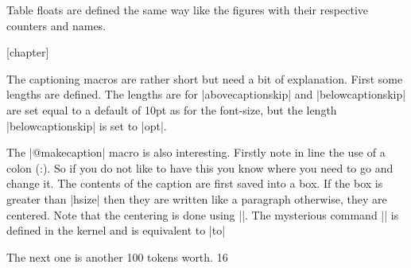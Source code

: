 \begin{multicols}{2}
 Table floats are defined the same way like the figures with their respective counters and names.  
\end{multicols}

\begin{teX}
[chapter]
\renewcommand \thetable
     {\ifnum \c@chapter>\z@ \thechapter.\fi \@arabic\c@table}
\def\fps@table{tbp}
\def\ftype@table{2}
\def\ext@table{lot}
\def\fnum@table{\tablename\nobreakspace\thetable}


\newenvironment{table}
               {\@float{table}}
               {\end@float}

\newenvironment{table*}
               {\@dblfloat{table}}
               {\end@dblfloat}
\end{teX}

\begin{multicols}{2}
The captioning macros are rather short but need a bit of explanation. First
some lengths are defined. The lengths are for |abovecaptionskip| and |belowcaptionskip| are set equal to a default of 10pt as for the font-size, but the length |belowcaptionskip| is set to |opt|.
\end{multicols}

\begin{teX}
\newlength\abovecaptionskip
\newlength\belowcaptionskip
\setlength{}
\setlength{}

\long{}
\end{teX}

\begin{multicols}{2}
The |@makecaption| macro is also interesting. Firstly note in line  the use of a colon (:). So if you do not like to have this you know where you need to go and change it. The contents of the caption are first saved into a box. If the box is greater than |hsize| then they are written like a paragraph otherwise, they are centered. Note that the centering is done using |\hfil\box\@tempoxa\hfil|. The mysterious command |\hb@xt| is defined in the kernel and
is equivalent to |\hbox to|
\end{multicols}

\begin{teXXX}
  \hb@xt@ The next one is another 100 tokens worth.
  16 \def\hb@xt@{\hbox to}
\end{teXXX}

